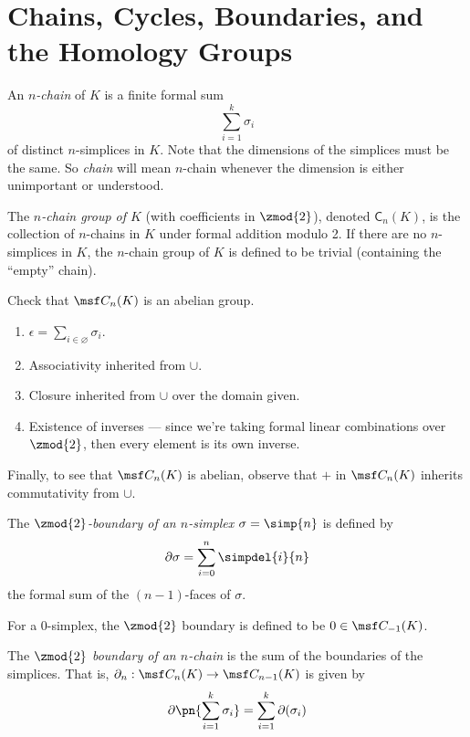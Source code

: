 \section{Chains, Cycles, Boundaries, and the Homology Groups}
\begin{definition}
  An \emph{$n$-chain} of $K$ is a finite formal sum
  \[
    \sum_{i=1}^k \sigma_i
  \]
  of distinct $n$-simplices in $K$. Note that the dimensions of the simplices
  must be the same. So \emph{chain} will mean $n$-chain whenever the dimension
  is either unimportant or understood.
\end{definition}
\begin{definition}
  The \emph{$n$-chain group of $K$} (with coefficients in $\zmod{2}$), denoted
  $\mathsf{C}_n(K)$, is the collection of $n$-chains in $K$ under formal
  addition modulo 2. If there are no $n$-simplices in $K$, the $n$-chain group
  of $K$ is defined to be trivial (containing the ``empty'' chain).
\end{definition}
\begin{problem}[16.1]
  Check that $\msf C_n(K)$ is an abelian group.
\end{problem}
\begin{solution}
  \begin{enumerate}[label=(\arabic*)]
    \item $\epsilon = \sum_{i \in \varnothing} \sigma_i$.
    \item Associativity inherited from $\cup$.
    \item Closure inherited from $\cup$ over the domain given.
    \item Existence of inverses --- since we're taking formal linear
      combinations over $\zmod{2}$, then every element is its own inverse.
  \end{enumerate}
  Finally, to see that $\msf C_n(K)$ is abelian, observe that $+$ in $\msf
  C_n(K)$ inherits commutativity from $\cup$.
\end{solution}
\begin{definition}
  The \emph{$\zmod{2}$-boundary of an $n$-simplex $\sigma = \simp{n}$} is
  defined by
  \[
    \partial \sigma = \sum_{i=0}^n \simpdel{i}{n}
  \]
  the formal sum of the $(n-1)$-faces of $\sigma$.

  For a 0-simplex, the $\zmod{2}$ boundary is defined to be $0 \in \msf
  C_{-1}(K)$.
\end{definition}
\begin{definition}
  The \emph{$\zmod{2}$ boundary of an $n$-chain} is the sum of the boundaries of
  the simplices. That is, $\partial_n : \msf C_n(K) \to \msf C_{n-1}(K)$ is
  given by
  \[
    \partial\pn{\sum_{i=1}^k \sigma_i} = \sum_{i=1}^k \partial(\sigma_i)
  \]
\end{definition}
